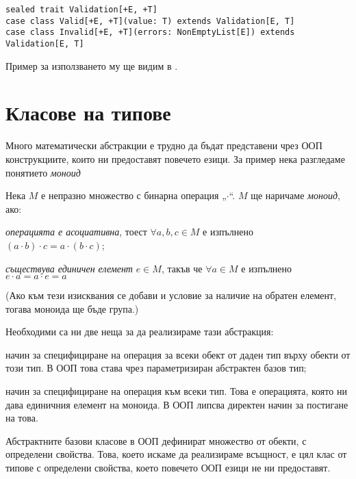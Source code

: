 \begin{lstlisting}
sealed trait Validation[+E, +T]
case class Valid[+E, +T](value: T) extends Validation[E, T]
case class Invalid[+E, +T](errors: NonEmptyList[E]) extends Validation[E, T]
\end{lstlisting}

Пример за използването му ще видим в .

\section{Класове на типове}
\label{sec:typeclasses}

Много математически абстракции е трудно да бъдат представени чрез ООП конструкциите, които ни предоставят повечето езици. За пример нека разгледаме понятието \emph{моноид}

\begin{definition}
  Нека $M$ е непразно множество с бинарна операция „$\cdot$“. $M$ ще наричаме \emph{моноид}, ако:
  
  \begin{itemize*}
    \item \emph{операцията е асоциативна}, тоест $\forall a, b, c \in M$ е изпълнено $(a \cdot b) \cdot c = a \cdot (b \cdot c)$;
    \item \emph{съществува единичен елемент} $e \in M$, такъв че $\forall a \in M$ е изпълнено $e \cdot a = a \cdot e = a$
  \end{itemize*}
\end{definition}

(Ако към тези изисквания се добави и условие за наличие на обратен елемент, тогава моноида ще бъде група.)

Необходими са ни две неща за да реализираме тази абстракция:

\begin{itemize*}
  \item начин за специфициране на операция за всеки обект от даден тип върху обекти от този тип. В ООП това става чрез параметризиран абстрактен базов тип;
  \item начин за специфициране на операция към всеки тип. Това е операцията, която ни дава единичния елемент на моноида. В ООП липсва директен начин за постигане на това. 
\end{itemize*}

Абстрактните базови класове в ООП дефинират множество от обекти, с определени свойства. Това, което искаме да реализираме всъщност, е цял клас от типове с определени свойства, което повечето ООП езици не ни предоставят.

